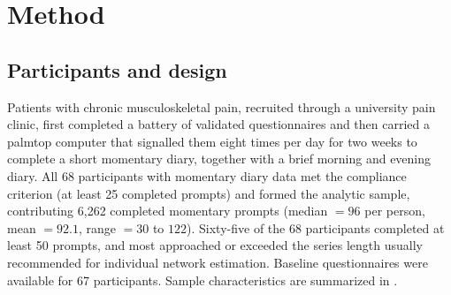 \documentclass[11pt,a4paper]{article}
\begin{document}
\section{Method}

\subsection{Participants and design}
Patients with chronic musculoskeletal pain, recruited through a university pain clinic, first
completed a battery of validated questionnaires and then carried a palmtop computer that
signalled them eight times per day for two weeks to complete a short momentary diary, together
with a brief morning and evening diary. All 68 participants with momentary diary data met the
compliance criterion (at least 25 completed prompts) and formed the analytic sample,
contributing 6,262 completed momentary prompts (median $=96$ per person, mean $=92.1$, range
$=30$ to $122$). Sixty-five of the 68 participants completed at least 50 prompts, and most
approached or exceeded the series length usually recommended for individual network estimation.
Baseline questionnaires were available for 67 participants. Sample characteristics are summarized
in .


\end{document}
